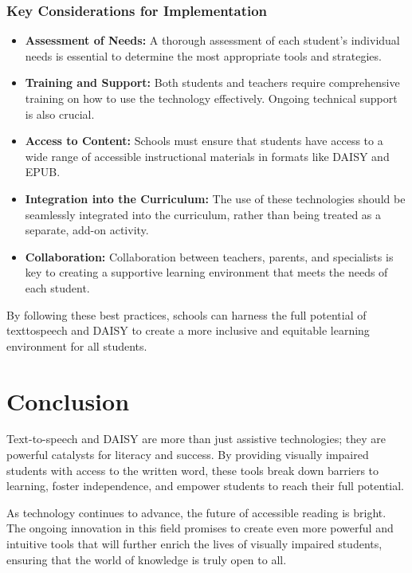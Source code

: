 \subsubsection{Key Considerations for Implementation}

\begin{itemize}
	\item \textbf{Assessment of Needs:} A thorough assessment of each student's individual needs is essential to determine the most appropriate tools and strategies.
	\item \textbf{Training and Support:} Both students and teachers require comprehensive training on how to use the technology effectively. Ongoing technical support is also crucial.
	\item \textbf{Access to Content:} Schools must ensure that students have access to a wide range of accessible instructional materials in formats like DAISY and EPUB.
	\item \textbf{Integration into the Curriculum:} The use of these technologies should be seamlessly integrated into the curriculum, rather than being treated as a separate, add-on activity.
	\item \textbf{Collaboration:} Collaboration between teachers, parents, and specialists is key to creating a supportive learning environment that meets the needs of each student.
\end{itemize}

By following these best practices, schools can harness the full potential of \gls{texttospeech} and DAISY to create a more inclusive and equitable learning environment for all students.

\section{Conclusion}

Text-to-speech and DAISY are more than just assistive technologies; they are powerful catalysts for literacy and success. By providing visually impaired students with access to the written word, these tools break down barriers to learning, foster independence, and empower students to reach their full potential.

As \gls{technology} continues to advance, the future of accessible reading is bright. The ongoing innovation in this field promises to create even more powerful and intuitive tools that will further enrich the lives of visually impaired students, ensuring that the world of knowledge is truly open to all.
